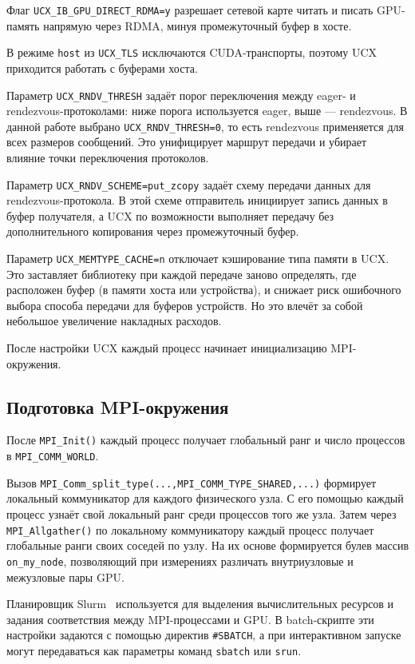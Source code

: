 \documentclass[a4paper,14pt]{extarticle}
\begin{document}
Флаг \texttt{UCX\_IB\_GPU\_DIRECT\_RDMA=y} разрешает сетевой карте читать и писать GPU-память напрямую через RDMA, минуя промежуточный буфер в хосте.

В режиме \texttt{host} из \texttt{UCX\_TLS} исключаются CUDA-транспорты, поэтому UCX приходится работать с буферами хоста.

Параметр \texttt{UCX\_RNDV\_THRESH} задаёт порог переключения между eager- и rendezvous-протоколами: ниже порога используется eager, выше --- rendezvous. В данной работе выбрано \texttt{UCX\_RNDV\_THRESH=0}, то есть rendezvous применяется для всех размеров сообщений. Это унифицирует маршрут передачи и убирает влияние точки переключения протоколов.

Параметр \texttt{UCX\_RNDV\_SCHEME=put\_zcopy} задаёт схему передачи данных для rendezvous-протокола. В этой схеме отправитель инициирует запись данных в буфер получателя, а UCX по возможности выполняет передачу без дополнительного копирования через промежуточный буфер.

Параметр \texttt{UCX\_MEMTYPE\_CACHE=n} отключает кэширование типа памяти в UCX. Это заставляет библиотеку при каждой передаче заново определять, где расположен буфер (в памяти хоста или устройства), и снижает риск ошибочного выбора способа передачи для буферов устройств. Но это влечёт за собой небольшое увеличение накладных расходов.

После настройки UCX каждый процесс начинает инициализацию MPI-окружения.

\subsection{Подготовка MPI-окружения}

После \texttt{MPI\_Init()} каждый процесс получает глобальный ранг и число процессов в \texttt{MPI\_COMM\_WORLD}.

Вызов \texttt{MPI\_Comm\_split\_type(...,\;MPI\_COMM\_TYPE\_SHARED,\;...)} формирует локальный коммуникатор для каждого физического узла. С его помощью каждый процесс узнаёт свой локальный ранг среди процессов того же узла. Затем через \texttt{MPI\_Allgather()} по локальному коммуникатору каждый процесс получает глобальные ранги своих соседей по узлу. На их основе формируется булев массив \texttt{on\_my\_node}, позволяющий при измерениях различать внутриузловые и межузловые пары GPU.

Планировщик Slurm~\cite{slurm} используется для выделения вычислительных ресурсов и задания соответствия между MPI-процессами и GPU. В batch-скрипте эти настройки задаются с помощью директив \texttt{\#SBATCH}, а при интерактивном запуске могут передаваться как параметры команд \texttt{sbatch} или \texttt{srun}.
\end{document}

